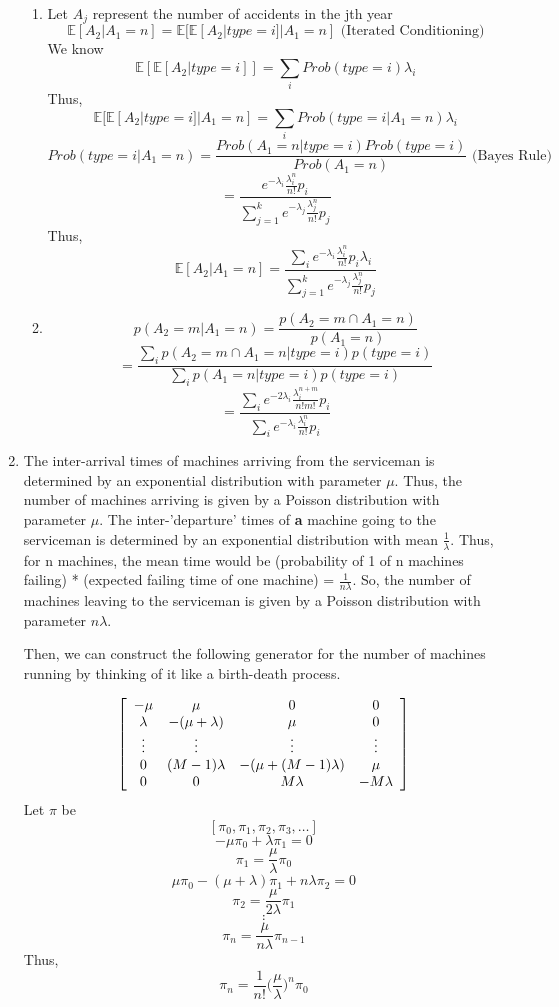 \documentclass[a4paper,11pt]{article}
\newenvironment{mat}{\left[ \begin{array}{ccccccccccccc}}{\end{array}\right]}
\newcommand\bcm{\begin{mat}}
\newcommand\ecm{\end{mat}}
\begin{document}
\begin{enumerate}
\begin{enumerate}

\item
Let $A_j$ represent the number of accidents in the jth year
\[\mathbb{E}[A_2|A_1=n] = \mathbb{E}[\mathbb{E}[A_2|type =i]|A_1=n] \text{ (Iterated Conditioning)}\]
We know
 \[\mathbb{E}[\mathbb{E}[A_2|type =i]] = \sum_i Prob(type=i) \lambda_i\]
Thus, 
\[ \mathbb{E}[\mathbb{E}[A_2|type =i]|A_1=n]  =  \sum_i Prob(type=i|A_1=n) \lambda_i  \]
\[ Prob(type=i | A_1=n) = \frac{ Prob(A_1=n|type=i) Prob(type =i)}{Prob(A_1=n)} \text{ (Bayes Rule)}\]
\[ = \frac{ e^{-\lambda_i} \frac{\lambda_i^n}{n!}p_i}{\sum_{j = 1}^k e^{-\lambda_j} \frac{\lambda_j^n}{n!}p_j} \]
Thus,
\[\mathbb{E}[A_2|A_1=n] = \frac{ \sum_i e^{-\lambda_i} \frac{\lambda_i^n}{n!}p_i \lambda_i }{\sum_{j = 1}^k e^{-\lambda_j} \frac{\lambda_j^n}{n!}p_j}\]

\item
\[p(A_2 = m | A_1 =n ) = \frac{p(A_2 = m \cap A_1 =n )}{p( A_1 =n )} \]
\[ = \frac{\sum_i p(A_2 = m \cap A_1 =n | type = i ) p(type =i)}{\sum_i p( A_1 =n | type = i ) p(type =i)} \]
\[ = \frac{\sum_i e^{-2\lambda_i} \frac{\lambda_i^{n+m}}{n!m!} p_i}{\sum_i e^{-\lambda_i} \frac{\lambda_i^n}{n!} p_i} \]
\end{enumerate}


\item
The inter-arrival times of machines arriving from the serviceman is determined by an exponential distribution with parameter $\mu$. Thus, the number of machines arriving is given by a Poisson distribution with parameter $\mu$. The inter-'departure' times of \textbf{a} machine going to the serviceman is determined by an exponential distribution with mean $\frac{1}{\lambda}$. 
Thus, for n machines, the mean time would be (probability of 1 of n machines failing) * (expected failing time of one machine) = $\frac{1}{n\lambda}$.
So, the number of machines leaving to the serviceman is given by a Poisson distribution with parameter $n \lambda$. 

Then, we can construct the following generator for the number of machines running by thinking of it like a birth-death process.

\[\bcm -\mu &\mu &0 &0  \\ \lambda &-(\mu+\lambda) &\mu  &0 \\  \vdots &\vdots   &\vdots &\vdots \\0 &(M-1)\lambda &-(\mu+(M-1)\lambda) &\mu    \\ 0 &0   &M\lambda &-M\lambda \ecm\]
Let $\pi$ be
\[ [\pi_0, \pi_1, \pi_2,\pi_3 ,\ldots]\]
\[-\mu \pi_0 + \lambda \pi_1 =0\]
\[\pi_1 = \frac{\mu}{\lambda}\pi_0\]
\[\mu \pi_{0} -(\mu +\lambda)\pi_1 + n \lambda \pi_{2} =0\]
\[\pi_2 = \frac{\mu}{2 \lambda} \pi_1\]
\[\vdots\]
\[\pi_n = \frac{\mu}{ n \lambda} \pi_{n-1}\]
Thus, \[\pi_n =
\frac{1}{n!}\bigg(\frac{\mu}{\lambda}\bigg)^n \pi_0 \]



\end{enumerate}
\end{document}
